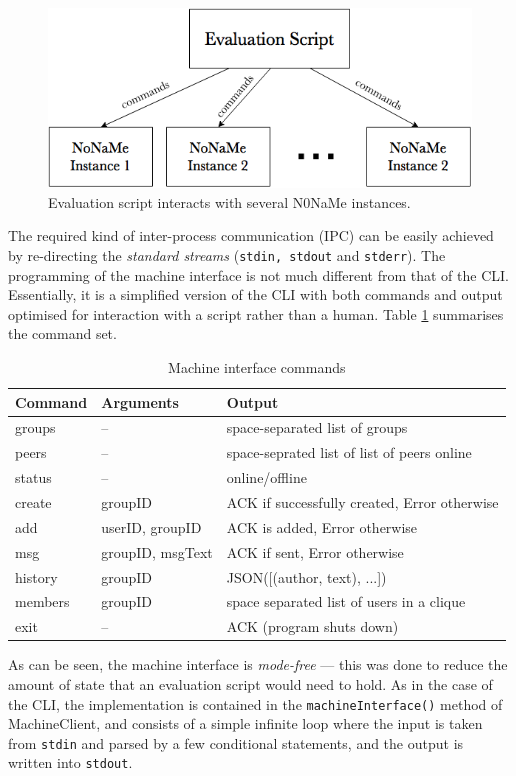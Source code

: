 \documentclass[a4paper, 12pt]{report}
\newcommand{\funkytt}{\fontfamily{AnonymousPro}\selectfont}
\begin{document}
\begin{figure}[H]
    \captionsetup{width=0.84\textwidth}
    \centering
    \includegraphics[width=0.76\linewidth]{pics/eval_script.png}
    \caption{\label{fig:eval_script} Evaluation script interacts with several {\funkytt N0NaMe} instances.}
\end{figure}

The required kind of inter-process communication (IPC) can be easily achieved by re-directing the \emph{standard streams} (\texttt{stdin, stdout} and \texttt{stderr}). The programming of the machine interface is not much different from that of the CLI. Essentially, it is a simplified version of the CLI with both commands and output optimised for interaction with a script rather than a human. Table \ref{tab:MachineInterface} summarises the command set.

\begin{table}[H]
\centering
\begin{tabular*}{0.95\textwidth}{l | l | l}
    Command & Arguments & Output \\
    \hline
    groups & -- & space-separated list of groups \\
    peers & -- & space-seprated list of list of peers online \\
    status & -- & online/offline \\
    create & groupID & ACK if successfully created, Error otherwise \\
    add & userID, groupID & ACK is added, Error otherwise \\
    msg & groupID, msgText & ACK if sent, Error otherwise \\
    history & groupID & JSON([(author, text), ...]) \\
    members & groupID & space separated list of users in a clique \\
    exit & -- & ACK (program shuts down)
\end{tabular*}
\caption{\label{tab:MachineInterface} Machine interface commands}
\end{table}
As can be seen, the machine interface is \emph{mode-free} --- this was done to reduce the amount of state that an evaluation script would need to hold. As in the case of the CLI, the implementation is contained in the \texttt{machineInterface()} method of MachineClient, and consists of a simple infinite loop where the input is taken from \texttt{stdin} and parsed by a few conditional statements, and the output is written into \texttt{stdout}.
\end{document}

